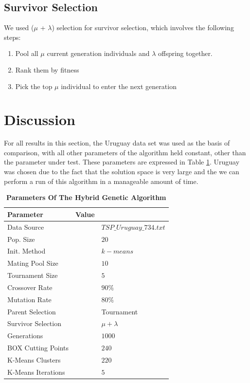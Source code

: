 \documentclass[12pt,twocolumn,oneside]{osajnl}
\begin{document}
\subsection{Survivor Selection}
We used ($\mu$ + $\lambda$) selection for survivor selection, which involves the following steps:

\begin{enumerate}
    \item Pool all $\mu$ current generation individuals and $\lambda$ offspring together.
    \item Rank them by fitness
    \item Pick the top $\mu$ individual to enter the next generation
\end{enumerate}



\section{Discussion}
For all results in this section, the Uruguay data set was used as the basis of comparison, with all other parameters of the algorithm held constant, other than the parameter under test. These parameters are expressed in Table \ref{tab:parameters}. Uruguay was chosen due to the fact that the solution space is very large and the we can perform a run of this algorithm in a manageable amount of time.
\begin{table}[htbp]
\centering
\caption{\bf Parameters Of The Hybrid Genetic Algorithm}
\begin{tabular}{lll}
\hline
Parameter & Value \\
\hline
Data Source && $TSP\_Uruguay\_734.txt$ \\
Pop. Size && $20$ \\
Init. Method && $k-means$ \\
Mating Pool Size && $10$ \\
Tournament Size && $5$ \\
Crossover Rate && $90\%$ \\
Mutation Rate && $80\%$ \\
Parent Selection && Tournament \\
Survivor Selection && $\mu + \lambda$ \\
Generations && $1000$ \\
BOX Cutting Points && $240$ \\
K-Means Clusters && $220$ \\
K-Means Iterations && $5$ \\



\hline
\end{tabular}
  \label{tab:parameters}
\end{table}
\end{document}
